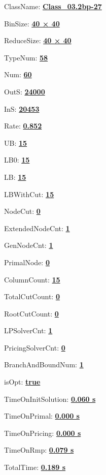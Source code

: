 \documentclass[11pt]{article}
\begin{document}
\pagestyle{empty}


ClassName: \underline{\textbf{Class_03.2bp-27}}
\par
BinSize: \underline{\textbf{40 × 40}}
\par
ReduceSize: \underline{\textbf{40 × 40}}
\par
TypeNum: \underline{\textbf{58}}
\par
Num: \underline{\textbf{60}}
\par
OutS: \underline{\textbf{24000}}
\par
InS: \underline{\textbf{20453}}
\par
Rate: \underline{\textbf{0.852}}
\par
UB: \underline{\textbf{15}}
\par
LB0: \underline{\textbf{15}}
\par
LB: \underline{\textbf{15}}
\par
LBWithCut: \underline{\textbf{15}}
\par
NodeCut: \underline{\textbf{0}}
\par
ExtendedNodeCnt: \underline{\textbf{1}}
\par
GenNodeCnt: \underline{\textbf{1}}
\par
PrimalNode: \underline{\textbf{0}}
\par
ColumnCount: \underline{\textbf{15}}
\par
TotalCutCount: \underline{\textbf{0}}
\par
RootCutCount: \underline{\textbf{0}}
\par
LPSolverCnt: \underline{\textbf{1}}
\par
PricingSolverCnt: \underline{\textbf{0}}
\par
BranchAndBoundNum: \underline{\textbf{1}}
\par
isOpt: \underline{\textbf{true}}
\par
TimeOnInitSolution: \underline{\textbf{0.060 s}}
\par
TimeOnPrimal: \underline{\textbf{0.000 s}}
\par
TimeOnPricing: \underline{\textbf{0.000 s}}
\par
TimeOnRmp: \underline{\textbf{0.079 s}}
\par
TotalTime: \underline{\textbf{0.189 s}}
\par
\newpage


\end{document}
